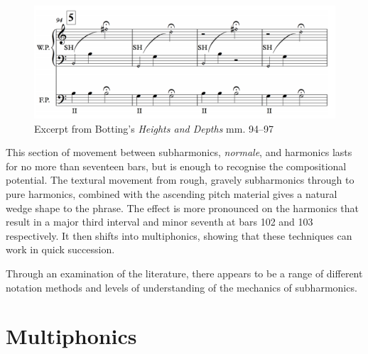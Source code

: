 \begin{figure}
  \centering
  \includegraphics[width=\linewidth]{./resources/bottingStave.png}
  \caption{Excerpt from Botting's \emph{Heights and Depths} mm. 94--97}\label{fig:BottingMultiphonics}\end{figure}

This section of movement between subharmonics, \emph{normale}, and harmonics lasts for no more than seventeen bars, but is enough to recognise the compositional potential.
The textural movement from rough, gravely subharmonics through to pure harmonics, combined with the ascending pitch material gives a natural wedge shape to the phrase.
The effect is more pronounced on the harmonics that result in a major third interval and minor seventh at bars 102 and 103 respectively.
It then shifts into multiphonics, showing that these techniques can work in quick succession.\autocite[154--155]{bottingDevelopingPersonalVocabulary2019}

Through an examination of the literature, there appears to be a range of different notation methods and levels of understanding of the mechanics of subharmonics.


\newpage
\section{Multiphonics}\label{sec:multiphonicsDiscussion}

